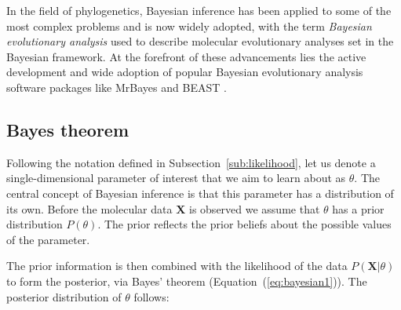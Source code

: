 In the field of phylogenetics, Bayesian inference has been applied to some of the most complex problems and is now widely adopted, with the term \emph{Bayesian evolutionary analysis} used to describe molecular evolutionary analyses set in the Bayesian framework.
At the forefront of these advancements lies the active development and wide adoption of popular Bayesian evolutionary analysis software packages like MrBayes \citep{Ronquist2012} and BEAST \citep{Drummond2012}.

\subsection{Bayes theorem\label{sub:bayesTheorem}}

Following the notation defined in Subsection~\ref{sub:likelihood}, let us denote a single-dimensional parameter of interest that we aim to learn about as $\theta$.
The central concept of Bayesian inference is that this parameter has a distribution of its own.
Before the molecular data $\mathbf{X}$ is observed we assume that $\theta$ has a prior distribution $P(\theta)$.
The prior reflects the prior beliefs about the possible values of the parameter.


The prior information is then combined with the likelihood of the data $P\left( \mathbf{X} | \theta \right)$ to form the posterior, via Bayes' theorem (Equation~(\ref{eq:bayesian1})).
The posterior distribution of $\theta$ follows:

